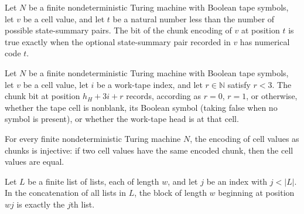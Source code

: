 \begin{lemma}
\label{Complexity.Codec.chunkBit_slot}
\leanok
{}
Let $N$ be a finite nondeterministic Turing machine with Boolean tape symbols, let $v$
be a cell value, and let $t$ be a natural number less than the number of possible
state-summary pairs. The bit of the chunk encoding of $v$ at position $t$ is true
exactly when the optional state-summary pair recorded in $v$ has numerical code $t$.
\end{lemma}

\begin{lemma}
\label{Complexity.Codec.chunkBit_tape}
\leanok
{}
Let $N$ be a finite nondeterministic Turing machine with Boolean tape symbols, let $v$
be a cell value, let $i$ be a work-tape index, and let $r\in\mathbb{N}$ satisfy $r<3$.
The chunk bit at position $h_H+3i+r$ records, according as $r=0$, $r=1$, or otherwise,
whether the tape cell is nonblank, its Boolean symbol (taking false when no symbol is
present), or whether the work-tape head is at that cell.
\end{lemma}

\begin{theorem}
\label{Complexity.Codec.encChunk_injective}
\leanok
{}
For every finite nondeterministic Turing machine $N$, the encoding of cell values as
chunks is injective: if two cell values have the same encoded chunk, then the cell
values are equal.
\end{theorem}

\begin{lemma}
\label{Complexity.Codec.take_drop_flatten}
\leanok
{}
Let $L$ be a finite list of lists, each of length $w$, and let $j$ be an index with
$j<|L|$. In the concatenation of all lists in $L$, the block of length $w$ beginning at
position $wj$ is exactly the $j$th list.
\end{lemma}

